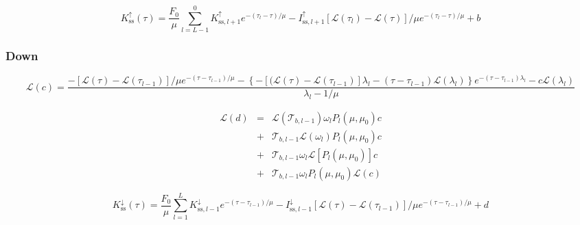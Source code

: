 \begin{equation}
K^{\uparrow}_{\mathrm{ss}}(\tau) = \frac{F_{0}}{\mu} \sum^{0}_{l = L-1} K^{\uparrow}_{\mathrm{ss},l + 1} e^{-(\tau_{l} - \tau) / \mu} - I^{\uparrow}_{\mathrm{ss},l + 1} \left[\mathcal{L}(\tau_{l}) - \mathcal{L}(\tau) \right] / \mu e^{-(\tau_{l} - \tau) / \mu} + b
\label{eq:single_scattering-tangent_linear-up-K_up_ss}
\end{equation}


%
\subsubsection{Down}
\label{sec:single_scattering-tangent_linear-down}

\begin{adjustwidth}{-1in}{-1in}
\center
\begin{equation}
\mathcal{L}(c) = \frac{-\left[\mathcal{L}(\tau) - \mathcal{L}(\tau_{l-1})\right] / \mu e^{-(\tau - \tau_{l-1}) / \mu} - \left\{-\left[(\mathcal{L}(\tau) - \mathcal{L}(\tau_{l-1})\right] \lambda_{l} - (\tau - \tau_{l-1}) \mathcal{L}(\lambda_{l})\right\} e^{- (\tau - \tau_{l-1}) \lambda_{l}} - c \mathcal{L}(\lambda_{l})}{\lambda_{l} - 1/\mu}
\label{eq:single_scattering-tangent_linear-down-c_l}
\end{equation}
\end{adjustwidth}

\begin{eqnarray}
\mathcal{L}(d) & = & \mathcal{L}(\mathcal{T}_{b,l-1}) \omega_{l} P_{l}(\mu, \mu_0) c \\
               & +  & \mathcal{T}_{b,l-1} \mathcal{L}(\omega_{l}) P_{l}(\mu, \mu_0) c \nonumber \\
               & +  & \mathcal{T}_{b,l-1} \omega_{l} \mathcal{L}\left[P_{l}(\mu, \mu_0)\right] c \nonumber \\
               & +  & \mathcal{T}_{b,l-1} \omega_{l} P_{l}(\mu, \mu_0) \mathcal{L}(c) \nonumber
\label{eq:single_scattering-tangent_linear-down-d_l}
\end{eqnarray}

\begin{equation}
K^{\downarrow}_{\mathrm{ss}}(\tau) = \frac{F_{0}}{\mu} \sum^{L}_{l = 1} K^{\downarrow}_{\mathrm{ss},l - 1} e^{- (\tau - \tau_{l-1}) / \mu} - I^{\downarrow}_{\mathrm{ss},l - 1} \left[\mathcal{L}(\tau) - \mathcal{L}(\tau_{l-1}) \right] / \mu e^{-(\tau - \tau_{l-1}) / \mu} + d
\label{eq:single_scattering-tangent_linear-down-K_down-ss}
\end{equation}


